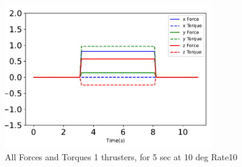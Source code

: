 \begin{figure}[htbp]\centerline{\includegraphics[width=0.8\textwidth]{AutoTeX/1Thrusters_5s_10deg_Loc2_Rate10}}\caption{All Forces and Torques 1 thrusters, for 5 sec at 10 deg Rate10}\label{fig:1Thrusters_5s_10deg_Loc2_Rate10}\end{figure}